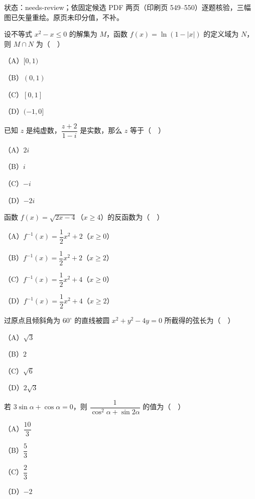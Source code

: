 

状态：needs-review；依固定候选 PDF 两页（印刷页 549–550）逐题核验，三幅图已矢量重绘。原页未印分值，不补。


\begin{question}
设不等式 $x^2-x\leqslant0$ 的解集为 $M$，函数 $f(x)=\ln(1-|x|)$ 的定义域为 $N$，则 $M\cap N$ 为（　）

（A）$[0,1)$

（B）$(0,1)$

（C）$[0,1]$

（D）$(-1,0]$

\end{question}
\begin{question}
已知 $z$ 是纯虚数，$\dfrac{z+2}{1-i}$ 是实数，那么 $z$ 等于（　）

（A）$2i$

（B）$i$

（C）$-i$

（D）$-2i$

\end{question}
\begin{question}
函数 $f(x)=\sqrt{2x-4}$（$x\geqslant4$）的反函数为（　）

（A）$f^{-1}(x)=\dfrac12x^2+2$（$x\geqslant0$）

（B）$f^{-1}(x)=\dfrac12x^2+2$（$x\geqslant2$）

（C）$f^{-1}(x)=\dfrac12x^2+4$（$x\geqslant0$）

（D）$f^{-1}(x)=\dfrac12x^2+4$（$x\geqslant2$）

\end{question}
\begin{question}
过原点且倾斜角为 $60^\circ$ 的直线被圆 $x^2+y^2-4y=0$ 所截得的弦长为（　）

（A）$\sqrt3$

（B）$2$

（C）$\sqrt6$

（D）$2\sqrt3$

\end{question}
\begin{question}
若 $3\sin\alpha+\cos\alpha=0$，则 $\dfrac1{\cos^2\alpha+\sin2\alpha}$ 的值为（　）

（A）$\dfrac{10}3$

（B）$\dfrac53$

（C）$\dfrac23$

（D）$-2$

\end{question}
